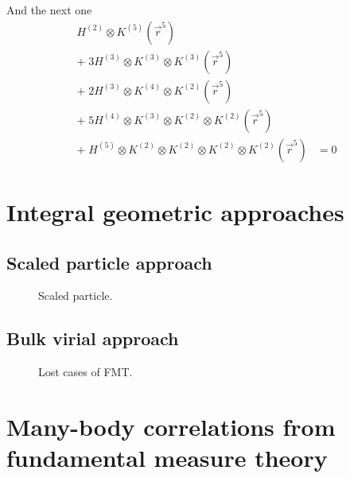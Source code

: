 \documentclass[12pt]{report}
\begin{document}
And the next one%
\begin{equation}
  \begin{aligned}
    H^{(2)} \otimes K^{(5)} (\vec{r}^5) & \\
    + \; 3 H^{(3)} \otimes K^{(3)} \otimes K^{(3)} (\vec{r}^5) & \\
    + \; 2 H^{(3)} \otimes K^{(4)} \otimes K^{(2)} (\vec{r}^5) & \\
    + \; 5 H^{(4)} \otimes K^{(3)} \otimes K^{(2)} \otimes K^{(2)} (\vec{r}^5) & \\
    + \; H^{(5)} \otimes K^{(2)} \otimes K^{(2)} \otimes K^{(2)} \otimes K^{(2)} (\vec{r}^5)
    &= 0
  \end{aligned}
\end{equation}

\section{Integral geometric approaches}

\subsection{Scaled particle approach}

\begin{figure}
  \missingfigure[figwidth=\linewidth]{}
  \caption{Scaled particle.}
\end{figure}

\subsection{Bulk virial approach}

\begin{figure}
  \missingfigure[figwidth=\linewidth]{}
  \caption{Lost cases of FMT.}
\end{figure}

\section{Many-body correlations from fundamental measure theory}
\end{document}
